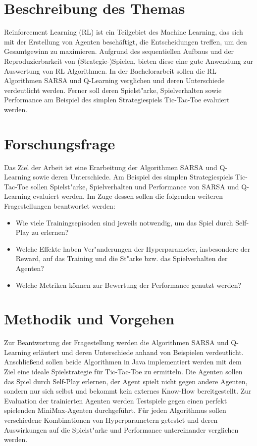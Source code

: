 \section*{Beschreibung des Themas}
Reinforcement Learning (RL) ist ein Teilgebiet des Machine Learning, das sich mit der Erstellung von Agenten beschäftigt, die Entscheidungen treffen, um den Gesamtgewinn zu maximieren. 
Aufgrund des sequentiellen Aufbaus und der Reproduzierbarkeit von (Strategie-)Spielen, bieten diese eine gute Anwendung zur Auswertung von RL Algorithmen. 
In der Bachelorarbeit sollen die RL Algorithmen SARSA und Q-Learning verglichen und deren Unterschiede verdeutlicht werden. 
Ferner soll deren Spielst"arke, Spielverhalten sowie Performance am Beispiel des simplen Strategiespiels Tic-Tac-Toe evaluiert werden. 

\section*{Forschungsfrage}
Das Ziel der Arbeit ist eine Erarbeitung der Algorithmen SARSA und Q-Learning sowie deren Unterschiede. 
Am Beispiel des simplen Strategiespiels Tic-Tac-Toe sollen Spielst"arke, Spielverhalten und Performance von SARSA und Q-Learning evaluiert werden. 
Im Zuge dessen sollen die folgenden weiteren Fragestellungen beantwortet werden:
\begin{itemize}
    \item Wie viele Trainingsepisoden sind jeweils notwendig, um das Spiel durch Self-Play zu erlernen?
    \item Welche Effekte haben Ver"anderungen der Hyperparameter, insbesondere der Reward, auf das Training und die St"arke bzw. das Spielverhalten der Agenten?
    \item Welche Metriken können zur Bewertung der Performance genutzt werden?
\end{itemize}

\section*{Methodik und Vorgehen}
Zur Beantwortung der Fragestellung werden die Algorithmen SARSA und Q-Learning erläutert und deren Unterschiede anhand von Beispielen verdeutlicht. 
Anschließend sollen beide Algorithmen in Java implementiert werden mit dem Ziel eine ideale Spielstrategie für Tic-Tac-Toe zu ermitteln. 
Die Agenten sollen das Spiel durch Self-Play erlernen, \dahe der Agent spielt nicht gegen andere Agenten, sondern nur sich selbst und bekommt kein externes Know-How bereitgestellt.
Zur Evaluation der trainierten Agenten werden Testspiele gegen einen perfekt spielenden MiniMax-Agenten durchgeführt. 
Für jeden Algorithmus sollen verschiedene Kombinationen von Hyperparametern getestet und deren Auswirkungen auf die Spielst"arke und Performance  untereinander verglichen werden. 

